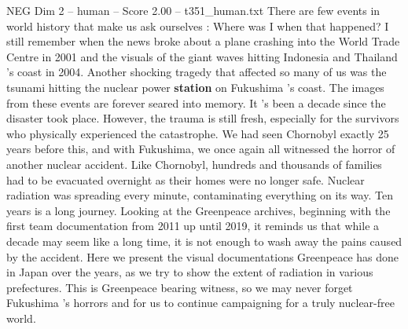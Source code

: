 \begin{textsample}{NEG Dim 2 – human – Score 2.00 – t351\_human.txt}  \label{ex:f2_neg_036}
There are few events in world history that make us ask ourselves : Where was I when that happened?
I still remember when the news broke about a plane crashing into the World Trade Centre in 2001 and the visuals of the giant waves hitting Indonesia and Thailand ’s coast in 2004.
Another shocking tragedy that affected so many of us was the tsunami hitting the nuclear power \textbf{station} on Fukushima ’s coast.
The images from these events are forever seared into memory.
It ’s been a decade since the disaster took place.
However, the trauma is still fresh, especially for the survivors who physically experienced the catastrophe.
We had seen Chornobyl exactly 25 years before this, and with Fukushima, we once again all witnessed the horror of another ​nuclear ​accident​. ​Like Chornobyl, hundreds and thousands of families had to be evacuated overnight as their homes were no longer safe.
Nuclear radiation was spreading every minute, contaminating everything on its way.
Ten years is a long journey.
Looking at the Greenpeace archives, beginning with the first team documentation from 2011 up until 2019, it reminds us that while a decade may seem like a long time, it is not enough to wash away the pains caused by the accident.
Here we present the visual documentations Greenpeace has done in Japan over the years, as we try to show the extent of radiation in various prefectures.
This is Greenpeace bearing witness, so we may never forget Fukushima ’s horrors and for us to continue campaigning for a truly nuclear-free world.

\end{textsample}
